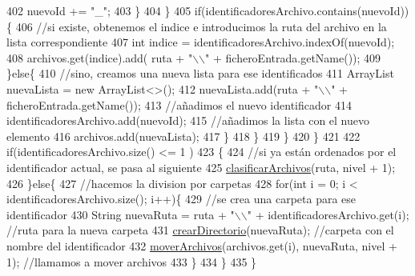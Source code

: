 \begin{DoxyCode}
402                             nuevoId += \textcolor{stringliteral}{"\_"};
403                         \}
404                     \}
405                     \textcolor{keywordflow}{if}(identificadoresArchivo.contains(nuevoId))\{
406                         \textcolor{comment}{//si existe, obtenemos el indice e introducimos la ruta del archivo en la lista
       correspondiente}
407                         \textcolor{keywordtype}{int} indice = identificadoresArchivo.indexOf(nuevoId);
408                         archivos.get(indice).add( ruta + \textcolor{stringliteral}{"\(\backslash\)\(\backslash\)"} + ficheroEntrada.getName());
409                     \}\textcolor{keywordflow}{else}\{
410                         \textcolor{comment}{//sino, creamos una nueva lista para ese identificados}
411                         ArrayList nuevaLista = \textcolor{keyword}{new} ArrayList<>();
412                         nuevaLista.add(ruta + \textcolor{stringliteral}{"\(\backslash\)\(\backslash\)"} + ficheroEntrada.getName());
413                         \textcolor{comment}{//añadimos el nuevo identificador}
414                         identificadoresArchivo.add(nuevoId);
415                         \textcolor{comment}{//añadimos la lista con el nuevo elemento}
416                         archivos.add(nuevaLista);
417                     \}
418                 \}
419             \}
420         \}
421         
422         \textcolor{keywordflow}{if}(identificadoresArchivo.size() <= 1 )
423         \{
424             \textcolor{comment}{//si ya están ordenados por el identificador actual, se pasa al siguiente}
425             \mbox{\hyperlink{classactualizadordoxy_1_1_actualizador_doxy_a552da974148de3397521e9ca911e5568}{clasificarArchivos}}(ruta, nivel + 1);
426         \}\textcolor{keywordflow}{else}\{
427             \textcolor{comment}{//hacemos la division por carpetas}
428             \textcolor{keywordflow}{for}(\textcolor{keywordtype}{int} i = 0; i < identificadoresArchivo.size(); i++)\{
429                 \textcolor{comment}{//se crea una carpeta para ese identificador}
430                 String nuevaRuta = ruta + \textcolor{stringliteral}{"\(\backslash\)\(\backslash\)"} + identificadoresArchivo.get(i); \textcolor{comment}{//ruta para la nueva
       carpeta}
431                 \mbox{\hyperlink{classactualizadordoxy_1_1_actualizador_doxy_a7d8af20d53904ac818f04740c5264d9f}{crearDirectorio}}(nuevaRuta); \textcolor{comment}{//carpeta con el nombre del identificador}
432                 \mbox{\hyperlink{classactualizadordoxy_1_1_actualizador_doxy_acf04af5d317d03499a2a05a3091592e5}{moverArchivos}}(archivos.get(i), nuevaRuta, nivel + 1); \textcolor{comment}{//llamamos a mover
       archivos}
433             \}
434         \}
435     \}
\end{DoxyCode}
\mbox{\label{classactualizadordoxy_1_1_actualizador_doxy_aebb9505e0384909ac6e2e677f400eaec}} 
